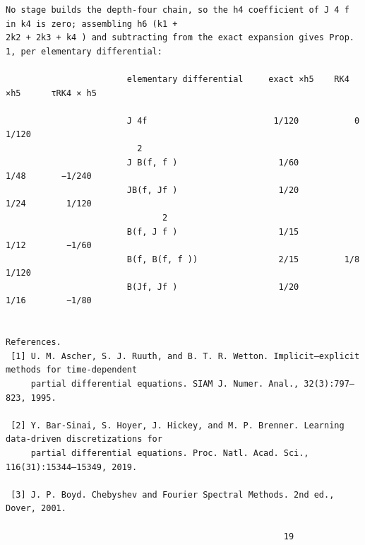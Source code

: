 \documentclass[letterpaper]{article}
\begin{document}
\begin{Verbatim}[fontsize=\fontsize{6.35}{7.15}\selectfont,breaklines=false]
No stage builds the depth-four chain, so the h4 coefficient of J 4 f in k4 is zero; assembling h6 (k1 +
2k2 + 2k3 + k4 ) and subtracting from the exact expansion gives Prop. 1, per elementary differential:

                        elementary differential     exact ×h5    RK4 ×h5      τRK4 × h5

                        J 4f                         1/120           0         1/120
                          2
                        J B(f, f )                    1/60         1/48       −1/240
                        JB(f, Jf )                    1/20         1/24        1/120
                               2
                        B(f, J f )                    1/15         1/12        −1/60
                        B(f, B(f, f ))                2/15         1/8         1/120
                        B(Jf, Jf )                    1/20         1/16        −1/80


References.
 [1] U. M. Ascher, S. J. Ruuth, and B. T. R. Wetton. Implicit–explicit methods for time-dependent
     partial differential equations. SIAM J. Numer. Anal., 32(3):797–823, 1995.

 [2] Y. Bar-Sinai, S. Hoyer, J. Hickey, and M. P. Brenner. Learning data-driven discretizations for
     partial differential equations. Proc. Natl. Acad. Sci., 116(31):15344–15349, 2019.

 [3] J. P. Boyd. Chebyshev and Fourier Spectral Methods. 2nd ed., Dover, 2001.

                                                       19
\end{Verbatim}
\newpage
\end{document}
